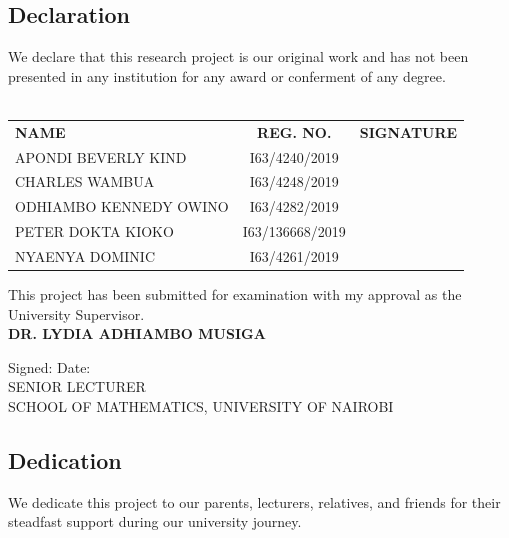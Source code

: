 \documentclass{article}
\numberwithin{equation}{section}
\begin{document}
	\subsection{Declaration}
	\noindent We declare that this research project is our original work and has not been presented in any institution for any award or conferment of any degree.\\\\
	
	\begin{tabular}{l c r }
		\vspace{0.5cm}
		\noindent
		\textbf{NAME} & \textbf{REG. NO.} & \textbf{SIGNATURE} \\
		\vspace{0.5cm}
		APONDI BEVERLY KIND & I63/4240/2019 & \dotfill  \\
		\vspace{0.5cm}
		CHARLES WAMBUA & I63/4248/2019 & \dotfill \\
		\vspace{0.5cm}
		ODHIAMBO KENNEDY OWINO & I63/4282/2019 & \dotfill \\
		\vspace{0.5cm}
		PETER DOKTA KIOKO& I63/136668/2019 & \dotfill \\
		\vspace{0.5cm}
		NYAENYA DOMINIC & I63/4261/2019 & \dotfill \\
	\end{tabular}
	
	\noindent This project has been submitted for examination with my approval as the University Supervisor.\\
	
	\vspace{0.5cm}
	\noindent \textbf{DR. LYDIA ADHIAMBO MUSIGA}\\
	
	\vspace{0.5cm}
	
	\noindent Signed: \dotfill Date: \dotfill \\
	
	\noindent SENIOR LECTURER\\
	SCHOOL OF MATHEMATICS, UNIVERSITY OF NAIROBI
	
	\newpage
	
	\subsection{Dedication}
	
	We dedicate this project to our parents, lecturers, relatives, and friends for their steadfast support during our university journey.
	
\end{document}
